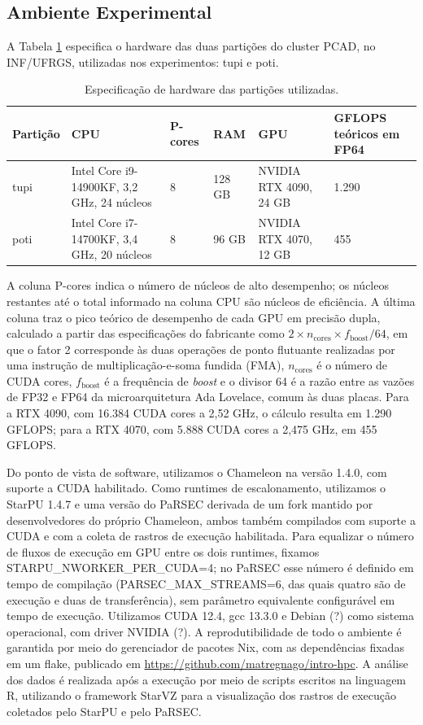 \documentclass[12pt]{article}
\begin{document}
\subsection{Ambiente Experimental}
\label{sec:org311a843}
A Tabela \ref{tab:hw} especifica o hardware das duas partições do cluster PCAD, no INF/UFRGS, utilizadas nos experimentos: tupi e poti.

\begin{table}[htbp]
\caption{\label{tab:hw}Especificação de hardware das partições utilizadas.}
\centering
\begin{tabular}{p{1.3cm}p{4.3cm}p{1.3cm}p{1.2cm}p{3.3cm}p{1.9cm}}
Partição & CPU & P-cores & RAM & GPU & GFLOPS teóricos em FP64\\
\hline
tupi & Intel Core i9-14900KF, 3,2 GHz, 24 núcleos & 8 & 128 GB & NVIDIA RTX 4090, 24 GB & 1.290\\
poti & Intel Core i7-14700KF, 3,4 GHz, 20 núcleos & 8 & 96 GB & NVIDIA RTX 4070, 12 GB & 455\\
\end{tabular}
\end{table}

A coluna P-cores indica o número de núcleos de alto desempenho; os núcleos
restantes até o total informado na coluna CPU são núcleos de eficiência. A
última coluna traz o pico teórico de desempenho de cada GPU em precisão dupla,
calculado a partir das especificações do fabricante como \(2 \times
n_{\mathrm{cores}} \times f_{\mathrm{boost}} / 64\), em que o fator 2 corresponde
às duas operações de ponto flutuante realizadas por uma instrução de
multiplicação-e-soma fundida (FMA), \(n_{\mathrm{cores}}\) é o número de CUDA
cores, \(f_{\mathrm{boost}}\) é a frequência de \emph{boost} e o divisor 64 é a razão
entre as vazões de FP32 e FP64 da microarquitetura Ada Lovelace, comum às duas
placas. Para a RTX 4090, com 16.384 CUDA cores a 2,52 GHz, o cálculo resulta em
1.290 GFLOPS; para a RTX 4070, com 5.888 CUDA cores a 2,475 GHz, em 455 GFLOPS.

Do ponto de vista de software, utilizamos o Chameleon na versão 1.4.0, com
suporte a CUDA habilitado. Como runtimes de escalonamento, utilizamos o StarPU
1.4.7 e uma versão do PaRSEC derivada de um fork mantido por desenvolvedores do
próprio Chameleon, ambos também compilados com suporte a CUDA e com a coleta de
rastros de execução habilitada. Para equalizar o número de fluxos de execução em
GPU entre os dois runtimes, fixamos STARPU\_NWORKER\_PER\_CUDA=4; no PaRSEC esse
número é definido em tempo de compilação (PARSEC\_MAX\_STREAMS=6, das quais
quatro são de execução e duas de transferência), sem parâmetro equivalente
configurável em tempo de execução. Utilizamos CUDA 12.4, gcc 13.3.0 e Debian (?)
como sistema operacional, com driver NVIDIA (?). A
reprodutibilidade de todo o
ambiente é garantida por meio do gerenciador de pacotes Nix, com as
dependências fixadas em um flake, publicado em
\url{https://github.com/matregnago/intro-hpc}. A análise dos dados é
realizada após a execução por meio de scripts escritos na linguagem R,
utilizando o framework StarVZ \cite{Pinto2021ProvidingIP} para a visualização
dos rastros de execução coletados pelo StarPU e pelo PaRSEC.
\end{document}
